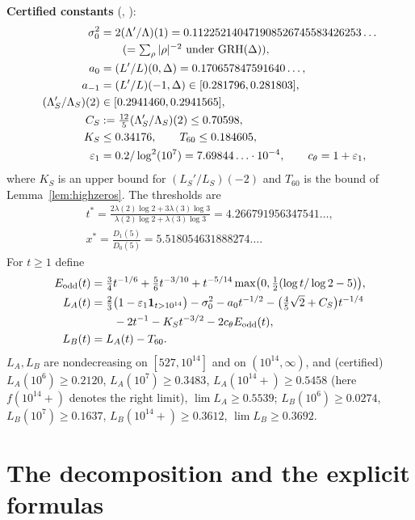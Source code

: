 \medskip\noindent\textbf{Certified constants} (, ):
\begin{align*}
\sigma_0^2&=2(\Lambda'/\Lambda)(1)=0.112252140471908526745583426253\ldots\\&\qquad(=\textstyle\sum_\rho|\rho|^{-2}\text{ under }\mathrm{GRH}(\Delta)),\\
a_0&=(L'/L)(0,\Delta)=0.170657847591640\ldots,\\ a_{-1}&=(L'/L)(-1,\Delta)\in[0.281796,0.281803],\\
(\Lambda_S'/\Lambda_S)(2)&\in[0.2941460,0.2941565],\\ C_S&:=\tfrac{12}5(\Lambda_S'/\Lambda_S)(2)\le0.70598,\\ K_S&\le0.34176,\qquad T_{60}\le0.184605,\\
\varepsilon_1&=0.2/\log^2(10^7)=7.69844\ldots\cdot10^{-4},\qquad c_\theta=1+\varepsilon_1,
\end{align*}
where $K_S$ is an upper bound for $(L_S'/L_S)(-2)$ and $T_{60}$ is the bound of Lemma~\ref{lem:highzeros}. The thresholds are
\begin{gather}\label{eq:tstar}
t^*=\frac{2\lambda(2)\log2+3\lambda(3)\log3}{\lambda(2)\log2+\lambda(3)\log3}=4.266791956347541\ldots,\\ x^*=\frac{D_1(5)}{D_0(5)}=5.518054631888274\ldots .
\end{gather}
For $t\ge1$ define
\begin{equation}\label{eq:LA}
\begin{aligned}
E_{\rm odd}(t)&=\tfrac34t^{-1/6}+\tfrac56t^{-3/10}+t^{-5/14}\max\bigl(0,\tfrac12(\log t/\log2-5)\bigr),\\
L_A(t)&=\tfrac23\bigl(1-\varepsilon_1\mathbf 1_{t>10^{14}}\bigr)-\sigma_0^2-a_0t^{-1/2}-\bigl(\tfrac45\sqrt2+C_S\bigr)t^{-1/4}\\&\qquad-2t^{-1}-K_St^{-3/2}-2c_\theta E_{\rm odd}(t),\\
L_B(t)&=L_A(t)-T_{60}.
\end{aligned}
\end{equation}
$L_A,L_B$ are nondecreasing on $[527,10^{14}]$ and on $(10^{14},\infty)$, and (certified) $L_A(10^6)\ge0.2120$, $L_A(10^7)\ge0.3483$, $L_A(10^{14}+)\ge0.5458$ (here $f(10^{14}+)$ denotes the right limit), $\lim L_A\ge0.5539$; $L_B(10^6)\ge0.0274$, $L_B(10^7)\ge0.1637$, $L_B(10^{14}+)\ge0.3612$, $\lim L_B\ge0.3692$.

\section{The decomposition and the explicit formulas}\label{sec:explicit}

